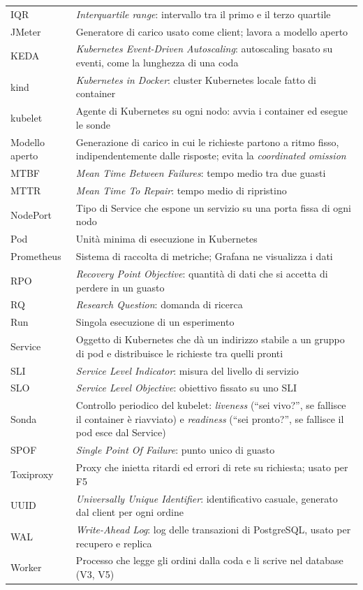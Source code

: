 \begin{longtable}{@{}lp{11.5cm}@{}}
IQR      & \textit{Interquartile range}: intervallo tra il primo e il terzo quartile \\
JMeter   & Generatore di carico usato come client; lavora a modello aperto \\
KEDA     & \textit{Kubernetes Event-Driven Autoscaling}: autoscaling basato su eventi, come la lunghezza di una coda \\
kind     & \textit{Kubernetes in Docker}: cluster Kubernetes locale fatto di container \\
kubelet  & Agente di Kubernetes su ogni nodo: avvia i container ed esegue le sonde \\
Modello aperto & Generazione di carico in cui le richieste partono a ritmo fisso, indipendentemente dalle risposte; evita la \textit{coordinated omission} \\
MTBF     & \textit{Mean Time Between Failures}: tempo medio tra due guasti \\
MTTR     & \textit{Mean Time To Repair}: tempo medio di ripristino \\
NodePort & Tipo di Service che espone un servizio su una porta fissa di ogni nodo \\
Pod      & Unità minima di esecuzione in Kubernetes \\
Prometheus & Sistema di raccolta di metriche; Grafana ne visualizza i dati \\
RPO      & \textit{Recovery Point Objective}: quantità di dati che si accetta di perdere in un guasto \\
RQ       & \textit{Research Question}: domanda di ricerca \\
Run      & Singola esecuzione di un esperimento \\
Service  & Oggetto di Kubernetes che dà un indirizzo stabile a un gruppo di pod e distribuisce le richieste tra quelli pronti \\
SLI      & \textit{Service Level Indicator}: misura del livello di servizio \\
SLO      & \textit{Service Level Objective}: obiettivo fissato su uno SLI \\
Sonda    & Controllo periodico del kubelet: \textit{liveness} (``sei vivo?'', se fallisce il container è riavviato) e \textit{readiness} (``sei pronto?'', se fallisce il pod esce dal Service) \\
SPOF     & \textit{Single Point Of Failure}: punto unico di guasto \\
Toxiproxy & Proxy che inietta ritardi ed errori di rete su richiesta; usato per F5 \\
UUID     & \textit{Universally Unique Identifier}: identificativo casuale, generato dal client per ogni ordine \\
WAL      & \textit{Write-Ahead Log}: log delle transazioni di PostgreSQL, usato per recupero e replica \\
Worker   & Processo che legge gli ordini dalla coda e li scrive nel database (V3, V5) \\
\end{longtable}
